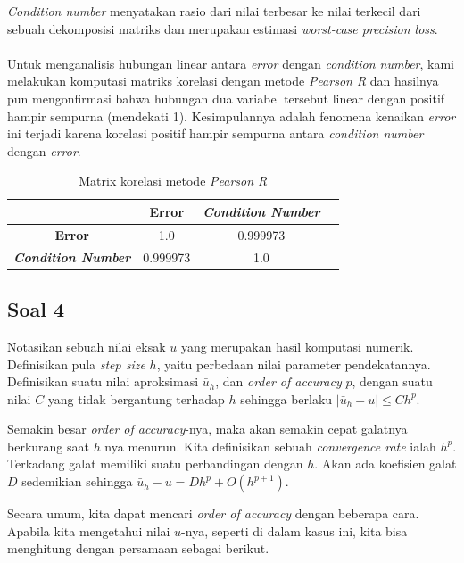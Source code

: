 \documentclass[10pt, a4paper, onecolumn, oneside, final]{report}
\begin{document}
\textit{Condition number} menyatakan rasio dari nilai terbesar ke nilai terkecil dari sebuah dekomposisi matriks dan merupakan estimasi \textit{worst-case precision loss}.\\ \\

Untuk menganalisis hubungan linear antara \textit{error} dengan \textit{condition number}, kami melakukan komputasi matriks korelasi dengan metode \textit{Pearson R} dan hasilnya pun mengonfirmasi bahwa hubungan dua variabel tersebut linear dengan positif hampir sempurna (mendekati 1). Kesimpulannya adalah fenomena kenaikan \textit{error} ini terjadi karena korelasi positif hampir sempurna antara \textit{condition number} dengan \textit{error}.

\begin{table}[H]
\caption{Matrix korelasi metode \textit{Pearson R}}
\begin{center}
\begin{tabular}{ |c|c|c|c| } 
\hline
 & \textbf{Error} & \textbf{\textit{Condition Number}} \\
\hline
\textbf{Error} & 1.0 & 0.999973 \\
\textbf{\textit{Condition Number}} & 0.999973 & 1.0 \\
\hline
\end{tabular}
\end{center}
\end{table}

\subsection*{Soal 4}

Notasikan sebuah nilai eksak $u$ yang merupakan hasil komputasi numerik. Definisikan pula \textit{step size} $h$, yaitu perbedaan nilai parameter pendekatannya. Definisikan suatu nilai aproksimasi $\bar{u}_h$, dan \textit{order of accuracy} $p$, dengan suatu nilai $C$ yang tidak bergantung terhadap $h$ sehingga berlaku $|\bar{u}_h - u| \leq Ch^p$.

Semakin besar \textit{order of accuracy}-nya, maka akan semakin cepat galatnya berkurang saat $h$ nya menurun. Kita definisikan sebuah \textit{convergence rate} ialah $h^p$. Terkadang galat memiliki suatu perbandingan dengan $h$. Akan ada koefisien galat $D$ sedemikian sehingga $\bar{u}_h - u = Dh^p + O(h^{p+1})$. 

Secara umum, kita dapat mencari \textit{order of accuracy} dengan beberapa cara. Apabila kita mengetahui nilai $u$-nya, seperti di dalam kasus ini, kita bisa menghitung dengan persamaan sebagai berikut.
\end{document}
